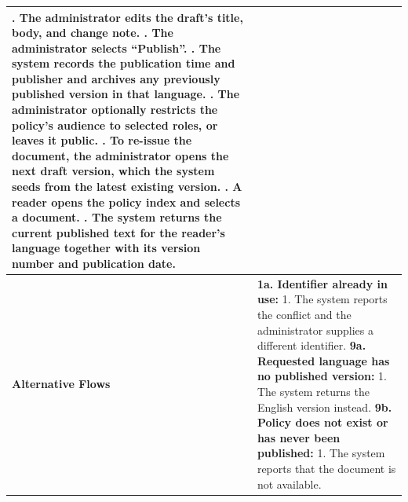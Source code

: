 \begin{longtable}{|>{\raggedright\arraybackslash}p{}|>{\raggedright\arraybackslash}p{}|}
3. The administrator edits the draft's title, body, and change note. \newline
4. The administrator selects ``Publish''. \newline
5. The system records the publication time and publisher and archives any previously published version in that language. \newline
6. The administrator optionally restricts the policy's audience to selected roles, or leaves it public. \newline
7. To re-issue the document, the administrator opens the next draft version, which the system seeds from the latest existing version. \newline
8. A reader opens the policy index and selects a document. \newline
9. The system returns the current published text for the reader's language together with its version number and publication date. \\ \hline
\textbf{Alternative Flows} &
\textbf{1a. Identifier already in use:} \newline
\hspace*{1em}1. The system reports the conflict and the administrator supplies a different identifier. \newline
\textbf{9a. Requested language has no published version:} \newline
\hspace*{1em}1. The system returns the English version instead. \newline
\textbf{9b. Policy does not exist or has never been published:} \newline
\hspace*{1em}1. The system reports that the document is not available. \\
\end{longtable}

\endgroup
